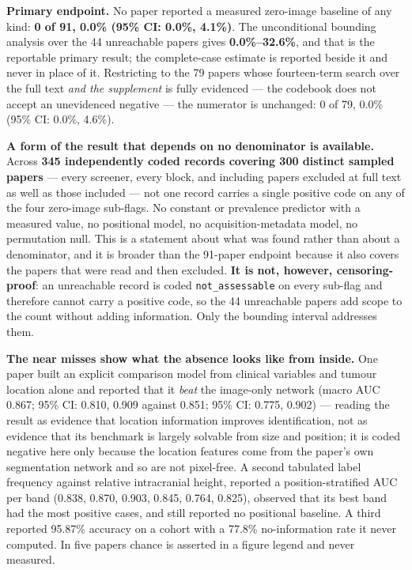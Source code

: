 \documentclass[11pt,a4paper]{article}
\begin{document}
\textbf{Primary endpoint.} No paper reported a measured zero-image baseline of
any kind: \textbf{0 of 91, 0.0\% (95\% CI: 0.0\%, 4.1\%)}. The unconditional
bounding analysis over the 44 unreachable papers gives \textbf{0.0\%--32.6\%},
and that is the reportable primary result; the complete-case estimate is
reported beside it and never in place of it. Restricting to the 79 papers whose
fourteen-term search over the full text \emph{and the supplement} is fully
evidenced --- the codebook does not accept an unevidenced negative --- the
numerator is unchanged: 0 of 79, 0.0\% (95\% CI: 0.0\%, 4.6\%).

\textbf{A form of the result that depends on no denominator is available.} Across
\textbf{345 independently coded records covering 300 distinct sampled papers} ---
every screener, every block, and including papers excluded at full text as well as
those included --- not one record carries a single positive code on any of the four
zero-image sub-flags. No constant or prevalence predictor with a measured value, no
positional model, no acquisition-metadata model, no permutation null. This is a
statement about what was found rather than about a denominator, and it is broader
than the 91-paper endpoint because it also covers the papers that were read and then
excluded. \textbf{It is not, however, censoring-proof}: an unreachable record is
coded \texttt{not\_assessable} on every sub-flag and therefore cannot carry a
positive code, so the 44 unreachable papers add scope to the count without adding
information. Only the bounding interval addresses them.

\textbf{The near misses show what the absence looks like from inside.} One paper
built an explicit comparison model from clinical variables and tumour location
alone and reported that it \emph{beat} the image-only network (macro AUC 0.867;
95\% CI: 0.810, 0.909 against 0.851; 95\% CI: 0.775, 0.902) --- reading the
result as evidence that location information improves identification, not as
evidence that its benchmark is largely solvable from size and position; it is
coded negative here only because the location features come from the paper's own
segmentation network and so are not pixel-free. A second tabulated label
frequency against relative intracranial height, reported a position-stratified
AUC per band (0.838, 0.870, 0.903, 0.845, 0.764, 0.825), observed that its best
band had the most positive cases, and still reported no positional baseline. A
third reported 95.87\% accuracy on a cohort with a 77.8\% no-information rate it
never computed. In five papers chance is asserted in a figure legend and never
measured.
\end{document}
